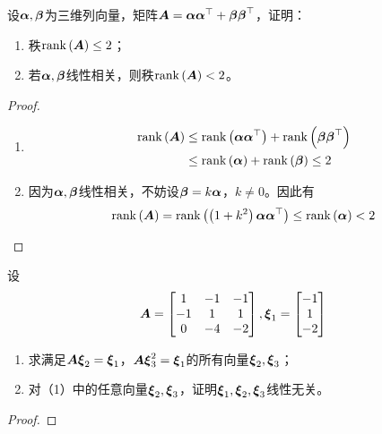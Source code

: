 \begin{problem}\label{problem-2.15}
设\(\vecal,\vecbeta\)为三维列向量，矩阵\(\mata=\vecal\vecal^\top+\vecbeta\vecbeta^\top\)，证明：
\begin{enumerate}
    \item 秩\(\rank{\mata}\le2\)；
    \item 若\(\vecal,\vecbeta\)线性相关，则秩\(\rank{\mata}<2\)。
\end{enumerate}
\end{problem}
\begin{proof}
    \begin{enumerate}
        \item \begin{align*}
                  \rank{\mata} & \leq\rank{\vecal\vecal^\top}+\rank{\vecbeta\vecbeta^\top} \\
                               & \leq\rank{\vecal}+\rank{\vecbeta}\leq2
              \end{align*}
        \item 因为\(\vecal,\vecbeta\)线性相关，不妨设\(\vecbeta=k\vecal\)，\(k\neq0\)。因此有
              \begin{equation*}
                  \rank{\mata}=\rank{\spar{1+k^2}\vecal\vecal^\top}\leq\rank{\vecal}<2
              \end{equation*}
    \end{enumerate}
\end{proof}

\begin{problem}\label{problem-2.16}
设
\begin{equation*}
    \mata=
    \begin{bmatrix}
        1  & -1 & -1 \\
        -1 & 1  & 1  \\
        0  & -4 & -2
    \end{bmatrix},
    \vecxi_1=\begin{bmatrix}-1\\1\\-2\end{bmatrix}
\end{equation*}
\begin{enumerate}
    \item 求满足\(\mata\vecxi_2=\vecxi_1\)，\(\mata\vecxi_3^2=\vecxi_1\)的所有向量\(\vecxi_2,\vecxi_3\)；
    \item 对（1）中的任意向量\(\vecxi_2,\vecxi_3\)，证明\(\vecxi_1,\vecxi_2,\vecxi_3\)线性无关。
\end{enumerate}
\end{problem}
\begin{proof}
\end{proof}

